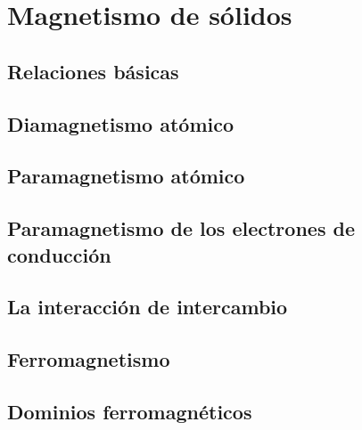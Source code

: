 \chapter{Magnetismo de sólidos} \label{Ch:10}

\section{Relaciones básicas}

\section{Diamagnetismo atómico}

\section{Paramagnetismo atómico}

\section{Paramagnetismo de los electrones de conducción}

\section{La interacción de intercambio}

\section{Ferromagnetismo}

\section{Dominios ferromagnéticos}

